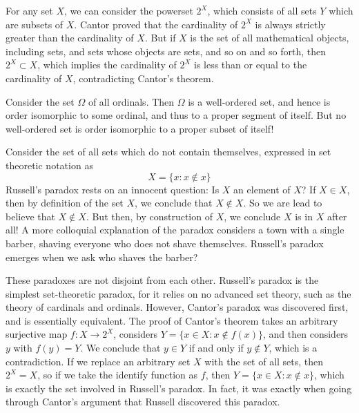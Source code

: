 \begin{example}
    For any set $X$, we can consider the powerset $2^X$, which consists of all sets $Y$ which are subsets of $X$. Cantor proved that the cardinality of $2^X$ is always strictly greater than the cardinality of $X$. But if $X$ is the set of all mathematical objects, including sets, and sets whose objects are sets, and so on and so forth, then $2^X \subset X$, which implies the cardinality of $2^X$ is less than or equal to the cardinality of $X$, contradicting Cantor's theorem.
\end{example}

\begin{example}
    Consider the set $\Omega$ of all ordinals. Then $\Omega$ is a well-ordered set, and hence is order isomorphic to some ordinal, and thus to a proper segment of itself. But no well-ordered set is order isomorphic to a proper subset of itself!
\end{example}

\begin{example}
    Consider the set of all sets which do not contain themselves, expressed in set theoretic notation as
    \[ X = \{ x: x \not \in x \} \]
    Russell's paradox rests on an innocent question: Is $X$ an element of $X$? If $X \in X$, then by definition of the set $X$, we conclude that $X \not \in X$. So we are lead to believe that $X \not \in X$. But then, by construction of $X$, we conclude $X$ is in $X$ after all! A more colloquial explanation of the paradox considers a town with a single barber, shaving everyone who does not shave themselves. Russell's paradox emerges when we ask who shaves the barber?
\end{example}

\begin{remark}
    These paradoxes are not disjoint from each other. Russell's paradox is the simplest set-theoretic paradox, for it relies on no advanced set theory, such as the theory of cardinals and ordinals. However, Cantor's paradox was discovered first, and is essentially equivalent. The proof of Cantor's theorem takes an arbitrary surjective map $f: X \to 2^X$, considers $Y = \{ x \in X: x \not \in f(x) \}$, and then considers $y$ with $f(y) = Y$. We conclude that $y \in Y$ if and only if $y \not \in Y$, which is a contradiction. If we replace an arbitrary set $X$ with the set of all sets, then $2^X = X$, so if we take the identify function as $f$, then $Y = \{ x \in X: x \not \in x \}$, which is exactly the set involved in Russell's paradox. In fact, it was exactly when going through Cantor's argument that Russell discovered this paradox.
\end{remark}

